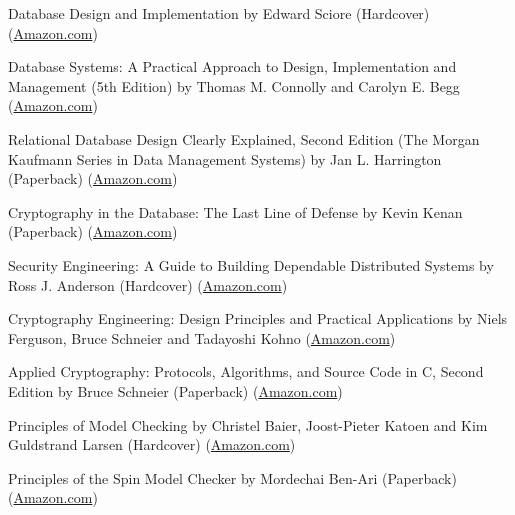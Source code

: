 \documentclass[10pt]{article}
\newenvironment{innerlist}[1][\enskip\textbullet]%
        {\begin{compactitem}[#1]}{\end{compactitem}}
\begin{document}
\begin{innerlist}
                \item Database Design and Implementation
                  by Edward Sciore (Hardcover)
                  (\href{http://www.amazon.com/Database-Design-Implementation-Edward-Sciore/dp/0471757160}{Amazon.com})
                \item Database Systems: A Practical Approach to Design, Implementation and Management (5th Edition)
                  by Thomas M. Connolly and Carolyn E. Begg
                  (\href{http://www.amazon.com/Database-Systems-Practical-Implementation-Management/dp/0321523067}{Amazon.com})
                \item Relational Database Design Clearly Explained, Second Edition (The Morgan Kaufmann Series in Data Management Systems)
                  by Jan L. Harrington (Paperback)
                  (\href{http://www.amazon.com/Relational-Database-Explained-Kaufmann-Management/dp/1558608206}{Amazon.com})

                \item Cryptography in the Database: The Last Line of Defense
                  by Kevin Kenan (Paperback)
                  (\href{http://www.amazon.com/Cryptography-Database-Last-Line-Defense/dp/0321320735}{Amazon.com})
                \item Security Engineering: A Guide to Building Dependable Distributed Systems
                  by Ross J. Anderson (Hardcover)
                  (\href{http://www.amazon.com/Security-Engineering-Building-Dependable-Distributed/dp/0470068523}{Amazon.com})
                \item Cryptography Engineering: Design Principles and Practical Applications
                  by Niels Ferguson, Bruce Schneier and Tadayoshi Kohno
                  (\href{http://www.amazon.com/Cryptography-Engineering-Principles-Practical-Applications/dp/0470474246}{Amazon.com})
                \item Applied Cryptography: Protocols, Algorithms, and Source Code in C, Second Edition
                  by Bruce Schneier (Paperback)
                  (\href{http://www.amazon.com/Applied-Cryptography-Protocols-Algorithms-Source/dp/0471117099}{Amazon.com})

                \item Principles of Model Checking
                  by Christel Baier, Joost-Pieter Katoen and Kim Guldstrand Larsen (Hardcover)
                  (\href{http://www.amazon.com/Principles-Model-Checking-Christel-Baier/dp/026202649X}{Amazon.com})
                \item Principles of the Spin Model Checker
                  by Mordechai Ben-Ari (Paperback)
                  (\href{http://www.amazon.com/Principles-Model-Checker-Mordechai-Ben-Ari/dp/1846287693}{Amazon.com})


\end{innerlist}
\end{document}

